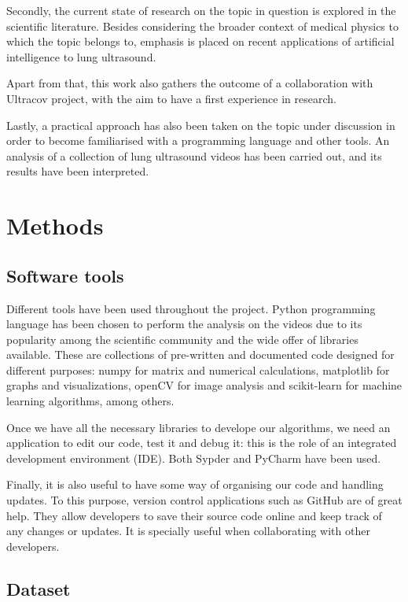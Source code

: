 \documentclass[11pt]{article} %
\begin{document}
	Secondly, the current state of research on the topic in question is explored in the scientific literature. Besides considering the broader context of medical physics to which the topic belongs to, emphasis is placed on recent applications of artificial intelligence to lung ultrasound.

	Apart from that, this work also gathers the outcome of a collaboration with Ultracov project, with the aim to have a first experience in research.

	Lastly, a practical approach has also been taken on the topic under discussion in order to become familiarised with a programming language and other tools. An analysis of a collection of lung ultrasound videos has been carried out, and its results have been interpreted. 
	
	
	
\section{Methods}

\subsection{Software tools}
	Different tools have been used throughout the project. Python programming language has been chosen to perform the analysis on the videos due to its popularity among the scientific community and the wide offer of libraries available. These are collections of pre-written and documented code designed for different purposes: numpy for matrix and numerical calculations, matplotlib for graphs and visualizations, openCV for image analysis and scikit-learn for machine learning algorithms, among others.

	Once we have all the necessary libraries to develope our algorithms, we need an application to edit our code, test it and debug it: this is the role of an integrated development environment (IDE). Both Sypder and PyCharm have been used.
	
	Finally, it is also useful to have some way of organising our code and handling updates. To this purpose, version control applications such as GitHub are of great help. They allow developers to save their source code online and keep track of any changes or updates. It is specially useful when collaborating with other developers.


\subsection{Dataset}
\end{document}
